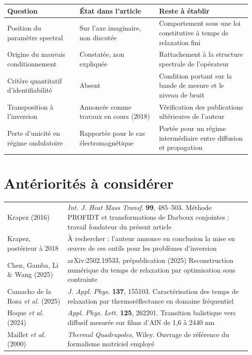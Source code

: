 \documentclass[11pt,a4paper]{article}
\begin{document}
\begin{center}
\begin{tabularx}{\textwidth}{@{}lXX@{}}
\toprule
\textbf{Question} & \textbf{État dans l'article} & \textbf{Reste à établir} \\
\midrule
Position du paramètre spectral & Sur l'axe imaginaire, non discutée &
Comportement sous une loi constitutive à temps de relaxation fini \\
\addlinespace
Origine du mauvais conditionnement & Constatée, non expliquée &
Rattachement à la structure spectrale de l'opérateur \\
\addlinespace
Critère quantitatif d'identifiabilité & Absent &
Condition portant sur la bande de mesure et le niveau de bruit \\
\addlinespace
Transposition à l'inversion & Annoncée comme travaux en cours (2018) &
Vérification des publications ultérieures de l'auteur \\
\addlinespace
Perte d'unicité en régime ondulatoire & Rapportée pour le cas électromagnétique &
Portée pour un régime intermédiaire entre diffusion et propagation \\
\bottomrule
\end{tabularx}
\end{center}

\section{Antériorités à considérer}

\begin{center}
\begin{tabularx}{\textwidth}{@{}lX@{}}
\toprule
Krapez (2016) & \emph{Int. J. Heat Mass Transf.} \textbf{99}, 485--503. Méthode PROFIDT et
transformations de Darboux conjointes ; travail fondateur du présent article \\
\addlinespace
Krapez, postérieur à 2018 & À rechercher : l'auteur annonce en conclusion la mise en {\oe}uvre de ces
outils pour les problèmes d'inversion \\
\addlinespace
Chen, Gamba, Li \& Wang (2025) & arXiv:2502.19533, prépublication (2025)
Reconstruction numérique du temps de relaxation par optimisation sous contrainte \\
\addlinespace
Camacho de la Rosa \emph{et al.} (2025) & \emph{J. Appl. Phys.} \textbf{137}, 155103. Caractérisation
des temps de relaxation par thermoréflectance en domaine fréquentiel \\
\addlinespace
Hoque \emph{et al.} (2024) & \emph{Appl. Phys. Lett.} \textbf{125}, 262201. Transition balistique vers
diffusif mesurée sur films d'AlN de 1,6 à 2440 nm \\
\addlinespace
Maillet \emph{et al.} (2000) & \emph{Thermal Quadrupoles}, Wiley. Ouvrage de référence du formalisme
matriciel employé \\
\bottomrule
\end{tabularx}
\end{center}
\end{document}
